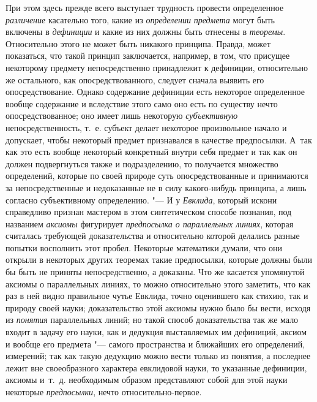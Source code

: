{{При этом здесь прежде всего выступает трудность провести
определенное {\em различение}
касательно того, какие из
{\em определении
}{\em предмета} могут
быть включены в {\em дефиниции}
и какие из них должны быть отнесены в
{\em теоремы}.
Относительно этого не может быть никакого принципа. Правда,
может показаться, что такой принцип заключается, например, в том, что
присущее некоторому предмету непосредственно принадлежит к дефиниции,
относительно же остального, как опосредствованного, следует сначала выявить
его опосредствование. Однако содержание дефиниции есть некоторое
определенное вообще содержание и вследствие этого само оно есть по существу
нечто опосредствованное; оно имеет лишь некоторую
{\em субъективную}
непосредственность, т.~е. субъект делает некоторое
произвольное начало и допускает, чтобы некоторый предмет признавался в
качестве предпосылки. А~так как это есть вообще некоторый конкретный внутри
себя предмет и так как он должен подвергнуться также и подразделению, то
получается множество определений, которые по своей природе суть
опосредствованные и принимаются за непосредственные и недоказанные не в
силу какого-нибудь принципа, а лишь согласно субъективному определению. "---
И у {\em Евклида},
который искони справедливо признан мастером в этом
синтетическом способе познания, под названием
{\em аксиомы} фигурирует
{\em предпосылка о параллельных
линиях}, которая считалась требующей доказательства и
относительно которой делались разные попытки восполнить этот пробел.
Некоторые математики думали, что они открыли в некоторых других теоремах
такие предпосылки, которые должны были бы быть не приняты непосредственно,
а доказаны. Что же касается упомянутой аксиомы о параллельных линиях, то
можно относительно этого заметить, что как раз в ней видно правильное чутье
Евклида, точно оценившего как стихию, так и природу своей науки;
доказательство этой аксиомы нужно было бы вести, исходя из
{\em понятия}
параллельных линий; но такой способ доказательства так же
мало входит в задачу его науки, как и дедукция выставляемых им дефиниций,
аксиом и вообще его предмета "--- самого пространства и
ближайших его определений, измерений; так как такую дедукцию можно вести
только из понятия, а последнее лежит вне своеобразного характера евклидовой
науки, то указанные дефиниции, аксиомы и~т.~д. необходимым образом
представляют собой для этой науки некоторые
{\em предпосылки}, нечто
относительно-первое.

}}
